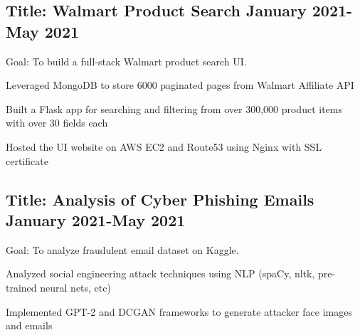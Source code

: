 \documentclass[11pt]{article}
\begin{document}
\subsection*{Title: Walmart Product Search \hfill {\normalfont January 2021-May 2021}}
\noindent
\href{https://github.com/Anthonyive/DSCI-551-Project.git}{} Goal: To build a full-stack Walmart product search UI.
\begin{compactitem}
    \item Leveraged MongoDB to store 6000 paginated pages from Walmart 
        Affiliate API
    \item Built a Flask app for searching and filtering from over 300,000 
        product items with over 30 fields each
    \item Hosted the UI website on AWS EC2 and Route53 using Nginx with SSL 
        certificate
\end{compactitem}
\vspace{0.1in}

\subsection*{Title: Analysis of Cyber Phishing Emails \hfill 
{\normalfont January 2021-May 2021}}
\noindent
\href{https://github.com/Anthonyive/DSCI-550-Assignments.git}{} 
Goal: To analyze fraudulent email dataset on Kaggle.
\begin{compactitem}
 \item Analyzed social engineering attack techniques using NLP (spaCy, 
     nltk, pre-trained neural nets, etc)
 \item Implemented GPT-2 and DCGAN frameworks to generate attacker 
     face images and emails
\end{compactitem}
\vspace{0.1in}

\end{document}
